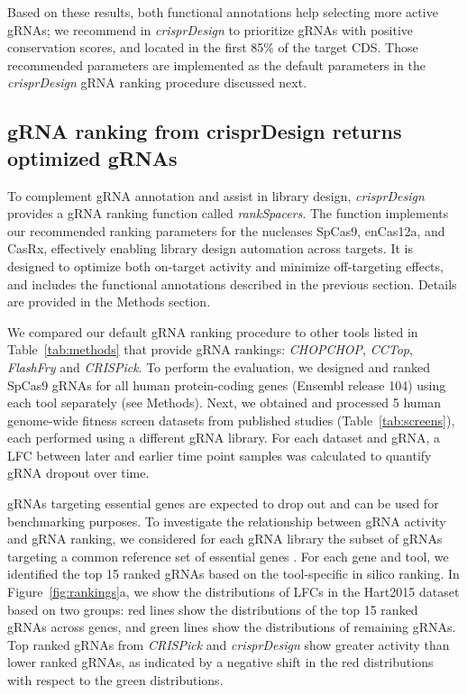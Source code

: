 \documentclass[pdftex,english,10pt]{article}
\begin{document}
Based on these results, both functional annotations help selecting more active gRNAs; we recommend in \textit{crisprDesign} to prioritize gRNAs with positive conservation scores, and located in the first 85\% of the target CDS. Those recommended parameters are implemented as the default parameters in the \textit{crisprDesign} gRNA ranking procedure discussed next. 



\subsection*{gRNA ranking from crisprDesign returns optimized gRNAs}

To complement gRNA annotation and assist in library design, \textit{crisprDesign} provides a gRNA ranking function called \textit{rankSpacers}. 
The function implements our recommended ranking parameters for the nucleases SpCas9, enCas12a, and CasRx, effectively enabling library design automation across targets. 
It is designed to optimize both on-target activity and minimize off-targeting effects, and includes the functional annotations described in the previous section. 
Details are provided in the Methods section. 


We compared our default gRNA ranking procedure to other tools listed in Table~\ref{tab:methods} that provide gRNA rankings: \textit{CHOPCHOP}, \textit{CCTop}, \textit{FlashFry} and \textit{CRISPick}. To perform the evaluation, we designed and ranked SpCas9 gRNAs for all human protein-coding genes (Ensembl release 104) using each tool separately (see Methods). Next, we obtained and processed 5 human genome-wide fitness screen datasets from published studies (Table~\ref{tab:screens}), each performed using a different gRNA library. For each dataset and gRNA, a LFC between later and earlier time point samples was calculated to quantify gRNA dropout over time. 

gRNAs targeting essential genes are expected to drop out and can be used for benchmarking purposes. 
To investigate the relationship between gRNA activity and gRNA ranking, we considered for each gRNA library the subset of gRNAs targeting a common reference set of essential genes \citep{hart2014}. For each gene and tool, we identified the top 15 ranked gRNAs based on the tool-specific in silico ranking. In Figure~\ref{fig:rankings}a, we show the distributions of LFCs in the Hart2015 dataset based on two groups: red lines show the distributions of the top 15 ranked gRNAs across genes, and green lines show the distributions of remaining gRNAs. Top ranked gRNAs from \textit{CRISPick} and \textit{crisprDesign} show greater activity than lower ranked gRNAs, as indicated by a negative shift in the red distributions with respect to the green distributions. 
\end{document}
